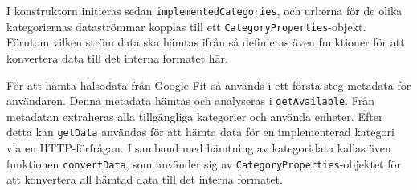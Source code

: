 \documentclass[techdoc/techdoc.tex]{subfiles}
\begin{document}
I konstruktorn initieras sedan \texttt{implementedCategories}, och url:erna för
de olika kategoriernas dataströmmar kopplas till ett
\texttt{CategoryProperties}-objekt. Förutom vilken ström data ska hämtas ifrån
så definieras även funktioner för att konvertera data till det interna formatet
här.

För att hämta hälsodata från Google Fit så används i ett första steg metadata
för användaren. Denna metadata hämtas och analyseras i \texttt{getAvailable}.
Från metadatan extraheras alla tillgängliga kategorier och använda enheter.
Efter detta kan \texttt{getData} användas för att hämta data för en
implementerad kategori via en HTTP-förfrågan. I samband med hämtning av
kategoridata kallas även funktionen \texttt{convertData}, som använder sig av
\texttt{CategoryProperties}-objektet för att konvertera all hämtad data till
det interna formatet.

\end{document}
